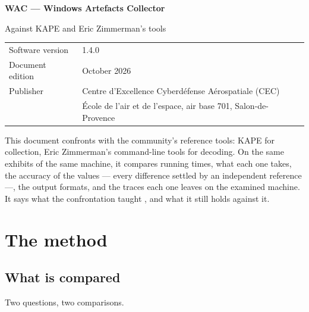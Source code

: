 \documentclass[11pt,a4paper,oneside]{report}
\begin{document}

\thispagestyle{empty}
\vspace*{\fill}
{\color{marine}\Large\bfseries WAC — Windows Artefacts Collector}\par
{\color{bleu}Against KAPE and Eric Zimmerman's tools}\par
\medskip
\begin{tabular}{@{}ll@{}}
Software version & 1.4.0 \\
Document edition & October 2026 \\
Publisher & Centre d'Excellence Cyberdéfense Aérospatiale (CEC) \\
          & École de l'air et de l'espace, air base 701, Salon-de-Provence \\
\end{tabular}

\bigskip
{\small\color{gris}This document confronts \wac{} with the community's
reference tools: KAPE for collection, Eric Zimmerman's command-line tools for
decoding. On the same exhibits of the same machine, it compares running times,
what each one takes, the accuracy of the values --- every difference settled by
an independent reference ---, the output formats, and the traces each one leaves
on the examined machine. It says what the confrontation taught
\wac{}, and what it still holds against it.}
\vspace*{2cm}
\clearpage

\tableofcontents

\chapter{The method}

\section{What is compared}

Two questions, two comparisons.
\end{document}
